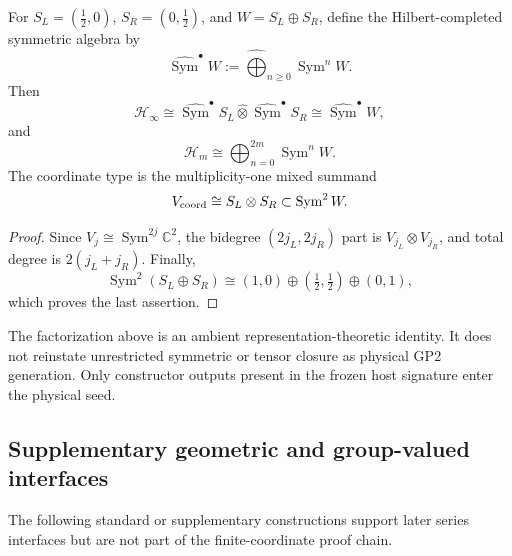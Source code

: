 \documentclass[11pt,a4paper]{article}
\begin{document}
\begin{theorem}
\label{p2:thm:ambient-symmetric-carrier}
For \(S_L=(\tfrac12,0)\), \(S_R=(0,\tfrac12)\), and
\(W=S_L\oplus S_R\), define the Hilbert-completed symmetric algebra by
\[
\widehat{\operatorname{Sym}}^{\bullet}W
:=\widehat{\bigoplus}_{n\ge0}\operatorname{Sym}^{n}W.
\]
Then
\begin{equation}
\label{p2:eq:ambient-symmetric-factorization}
\mathcal H_\infty
\cong
\widehat{\operatorname{Sym}}^{\bullet}S_L\widehat\otimes
\widehat{\operatorname{Sym}}^{\bullet}S_R
\cong
\widehat{\operatorname{Sym}}^{\bullet}W,
\end{equation}
and
\begin{equation}
\label{p2:eq:finite-symmetric-initial-segment}
\mathcal H_m
\cong
\bigoplus_{n=0}^{2m}\operatorname{Sym}^{n}W.
\end{equation}
The coordinate type is the multiplicity-one mixed summand
\begin{equation}
\label{p2:eq:coordinate-mixed-quadratic}
V_{\rm coord}
\cong
S_L\otimes S_R
\subset\operatorname{Sym}^2W.
\end{equation}
\end{theorem}

\begin{proof}
Since \(V_j\cong\operatorname{Sym}^{2j}\mathbb C^2\), the bidegree
\((2j_L,2j_R)\) part is \(V_{j_L}\otimes V_{j_R}\), and total degree is
\(2(j_L+j_R)\).  Finally,
\[
\operatorname{Sym}^2(S_L\oplus S_R)
\cong
(1,0)\oplus(\tfrac12,\tfrac12)\oplus(0,1),
\]
which proves the last assertion.
\end{proof}

\begin{remark}
\label{p2c:rem:ambient-symmetric-not-gp2}
The factorization above is an ambient representation-theoretic identity.  It
does not reinstate unrestricted symmetric or tensor closure as physical GP2
generation.  Only constructor outputs present in the frozen host signature
enter the physical seed.
\end{remark}


\subsection{Supplementary geometric and group-valued interfaces}
\label{p2c:app:supplementary-geometric-interfaces}
The following standard or supplementary constructions support later series
interfaces but are not part of the finite-coordinate proof chain.
\end{document}
